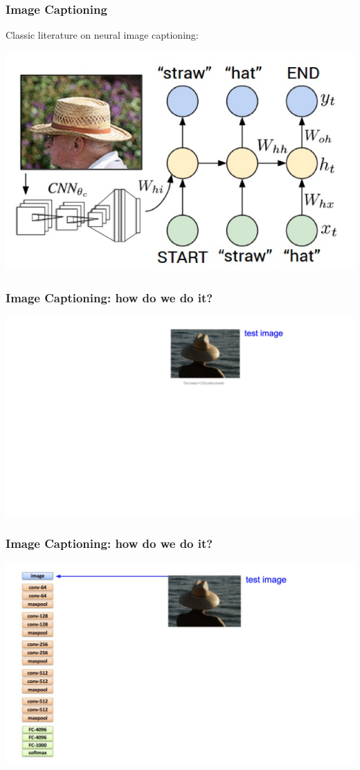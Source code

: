 \documentclass[aspectratio=1610]{beamer} %
\begin{document}
\begin{frame}

\frametitle{Image Captioning}


Classic literature on neural image captioning: \\\citet{mao2014explain,karpathy2015deep,vinyals2015tell,donahue2016longterm,chen2014learning}

\begin{center}
\includegraphics[width=.7\textwidth]{pics/hat}
\end{center}

\end{frame}


\begin{frame}
\frametitle{Image Captioning: how do we do it?}
\begin{center}
\includegraphics[width=.9\textwidth]{pics/cap1}
\end{center}
\end{frame}


\begin{frame}
\frametitle{Image Captioning: how do we do it?}
\begin{center}
\includegraphics[width=.9\textwidth]{pics/cap2}
\end{center}
\end{frame}
\end{document}
